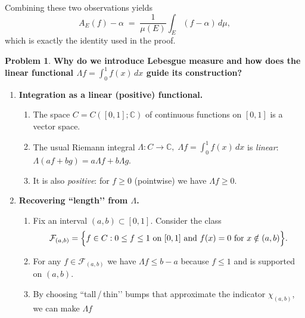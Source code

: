 \documentclass[12pt]{article}
\theoremstyle{definition} %
\newtheorem{problem}{Problem}
\theoremstyle{plain} %
\begin{document}
Combining these two observations yields
\[
    A_E(f)-\alpha
    \;=\;
    \frac{1}{\mu(E)}\int_E (f-\alpha)\,d\mu,
\]
which is exactly the identity used in the proof.
\pagebreak
\begin{problem}
  \textbf{Why do we introduce Lebesgue measure and how does the
  linear functional $\displaystyle\Lambda f=\int_0^1 f(x)\,dx$
  guide its construction?}
  \begin{enumerate}
  \item \textbf{Integration as a linear (positive) functional.}
        \begin{enumerate}[label=(\alph*)]
            \item The space 
                  \(
                      C=C([0,1];\mathbb{C})
                  \)
                  of continuous functions on $[0,1]$ is a vector space.
            \item The usual Riemann integral
                  \(
                      \Lambda:C\to\mathbb{C},\;
                      \Lambda f=\int_0^1 f(x)\,dx
                  \)
                  is \emph{linear}:
                  $\Lambda(af+bg)=a\Lambda f+b\Lambda g$.
            \item It is also \emph{positive}:
                  for $f\ge0$ (pointwise) we have $\Lambda f\ge0$.
        \end{enumerate}
  \item \textbf{Recovering ``length’’ from $\Lambda$.}
        \begin{enumerate}[label=(\alph*)]
            \item Fix an interval $(a,b)\subset[0,1]$.
                  Consider the class
                  \[
                      \mathcal{F}_{(a,b)}
                      =\Bigl\{f\in C:0\le f\le1\text{ on }[0,1]
                             \text{ and }f(x)=0\text{ for }x\notin(a,b)\Bigr\}.
                  \]
            \item For any $f\in\mathcal{F}_{(a,b)}$ we have
                  $\Lambda f\le b-a$ because $f\le1$ and is supported
                  on $(a,b)$.
            \item By choosing ``tall\,/\,thin’’ bumps that approximate
                  the indicator $\chi_{(a,b)}$, we can make $\Lambda f$

\end{enumerate}
\end{enumerate}
\end{problem}
\end{document}
